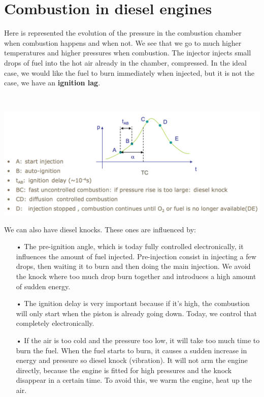 \section{Combustion in diesel engines}
	Here is represented the evolution of the pressure in the combustion chamber when combustion happens and when not. We see that we go to much higher temperatures and higher pressures when combustion. The injector injects small drops of fuel into the hot air already in the chamber, compressed. In the ideal case, we would like the fuel to burn immediately when injected, but it is not the case, we have an \textbf{ignition lag}. 
	
	\ \\
	
\begin{center}
\includegraphics[scale=0.45]{ch3/7}
\end{center}

We can also have diesel knocks. These ones are influenced by: 
	\begin{itemize}
	\item[•] The pre-ignition angle, which is today fully controlled electronically, it influences the amount of fuel injected. Pre-injection consist in injecting a few drops, then waiting it to burn and then doing the main injection. We avoid the knock where too much drop burn together and introduces a high amount of sudden energy. 
	
	\item[•] The ignition delay is very important because if it's high, the combustion will only start when the piston is already going down. Today, we control that completely electronically.
	
	\item[•] If the air is too cold and the pressure too low, it will take too much time to burn the fuel. When the fuel starts to burn, it causes a sudden increase in energy and pressure so diesel knock (vibration). It will not arm the engine directly, because the engine is fitted for high pressures and the knock disappear in a certain time. To avoid this, we warm the engine, heat up the air.
	\end{itemize}
 
